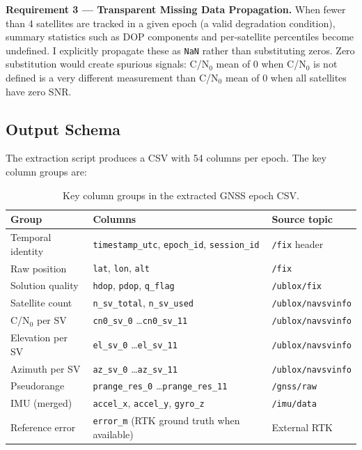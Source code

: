 \documentclass[12pt,a4paper]{article}
\newcommand{\code}[1]{\texttt{#1}}
\begin{document}
\textbf{Requirement 3 --- Transparent Missing Data Propagation.}
When fewer than 4 satellites are tracked in a given epoch (a valid degradation condition),
summary statistics such as DOP components and per-satellite percentiles become undefined.
I explicitly propagate these as \code{NaN} rather than substituting zeros.
Zero substitution would create spurious signals: C/N$_0$ mean of 0 when C/N$_0$ is not
defined is a very different measurement than C/N$_0$ mean of 0 when all satellites have
zero SNR.

\subsection{Output Schema}

The extraction script produces a CSV with 54 columns per epoch.
The key column groups are:

\begin{table}[H]
  \centering
  \caption{Key column groups in the extracted GNSS epoch CSV.}
  \begin{tabular}{lll}
    \toprule
    \textbf{Group} & \textbf{Columns} & \textbf{Source topic} \\
    \midrule
    Temporal identity  & \code{timestamp\_utc}, \code{epoch\_id}, \code{session\_id} &
      \code{/fix} header \\
    Raw position       & \code{lat}, \code{lon}, \code{alt}    & \code{/fix} \\
    Solution quality   & \code{hdop}, \code{pdop}, \code{q\_flag} & \code{/ublox/fix} \\
    Satellite count    & \code{n\_sv\_total}, \code{n\_sv\_used} & \code{/ublox/navsvinfo} \\
    C/N$_0$ per SV    & \code{cn0\_sv\_0} \ldots \code{cn0\_sv\_11} & \code{/ublox/navsvinfo} \\
    Elevation per SV  & \code{el\_sv\_0} \ldots \code{el\_sv\_11} & \code{/ublox/navsvinfo} \\
    Azimuth per SV    & \code{az\_sv\_0} \ldots \code{az\_sv\_11} & \code{/ublox/navsvinfo} \\
    Pseudorange       & \code{prange\_res\_0} \ldots \code{prange\_res\_11} & \code{/gnss/raw} \\
    IMU (merged)      & \code{accel\_x}, \code{accel\_y}, \code{gyro\_z} & \code{/imu/data} \\
    Reference error   & \code{error\_m} (RTK ground truth when available) & External RTK \\
    \bottomrule
  \end{tabular}
\end{table}
\end{document}
